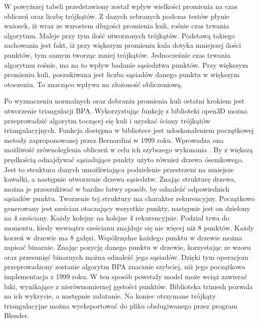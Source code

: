 W powyższej tabeli przedstawiony został wpływ wielkości promienia na czas obliczeń oraz liczbę trójkątów. Z danych zebranych podczas testów płynie wniosek, iż wraz ze wzrostem długości promienia kuli, rośnie czas trwania algorytmu. Maleje przy tym ilość utworzonych trójkątów. Podstawą takiego zachowania jest fakt, iż przy większym promieniu kula dotyka mniejszej ilości punktów, tym samym tworząc mniej trójkątów. Jednocześnie czas trwania algorytmu rośnie, ma na to wpływ badanie sąsiedztwa punktów. Przy większym promieniu kuli, poszukiwana jest liczba sąsiadów danego punktu w większym otoczeniu. To znacząco wpływa na złożoność obliczeniową.

Po wyznaczeniu normalnych oraz dobraniu promienia kuli ostatni krokiem jest utworzenie triangulacji BPA. Wykorzystując funkcję z biblioteki open3D można przeprowadzić algorytm toczącej się kuli i uzyskać ściany trójkątów triangulacyjnych. Funkcja dostępna w bibliotece jest udoskonaleniem początkowej metody zaproponowanej przez Bernardini w 1999 roku. Wprowadza ona możliwość zrównoleglenia obliczeń w celu ich szybszego wykonania \cite{digne2014analysis}. By z większą prędkością odnajdywać sąsiadujące punkty użyto również drzewa ósemkowego. Jest to struktura danych umożliwiająca podzielenie przestrzeni na mniejsze kawałki, a następnie utworzenie drzewa sąsiedztw. Znając strukturę drzewa, można je przeszukiwać w bardzo łatwy sposób, by odnaleźć odpowiednich sąsiadów punktu. Tworzenie tej struktury ma charakter rekurencyjny. Początkowo generowany jest sześcian otaczający wszystkie punkty, następnie jest on dzielony na 4 sześciany. Każdy kolejny na kolejne 4 rekurencyjnie. Podział trwa do momentu, kiedy wewnątrz sześcianu znajduje się nie więcej niż 8 punktów. Każdy korzeń w drzewie ma 8 gałęzi. Współrzędne każdego punktu w drzewie można zapisać binarnie. Znając pozycję danego punktu w drzewie, korzystając ze wzoru oraz przesunięć binarnych można odnaleźć jego sąsiadów. Dzięki tym operacjom przeprowadzony zostanie algorytm BPA znacznie szybciej, niż jego początkowa implementacja z 1999 roku. W ten sposób powstały model może wciąż zawierać luki, wynikające z nierównomiernej gęstości punktów. Biblioteka trimesh pozwala na ich wykrycie, a następnie załatanie. Na koniec otrzymane trójkąty triangulacyjne można wyeksportować do pliku obsługiwanego przez program Blender.





